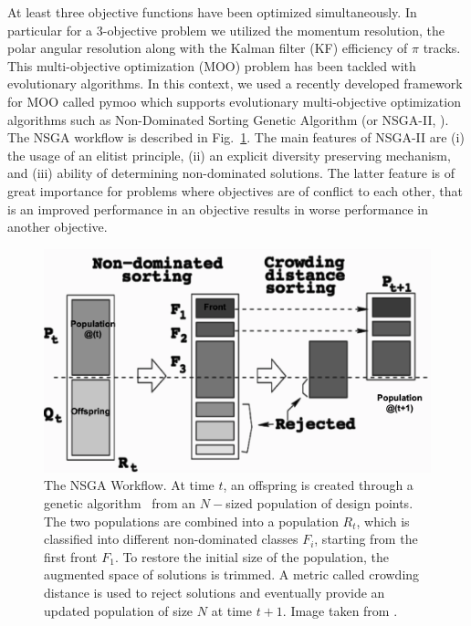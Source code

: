 At least three objective functions have been optimized simultaneously. In particular for a 3-objective problem we utilized the momentum resolution, the polar angular resolution along with the Kalman filter (KF) efficiency of $\pi$ tracks. 
This multi-objective optimization (MOO) problem has been tackled with evolutionary algorithms. 
In this context, we used a recently developed framework for MOO called pymoo \cite{blank2020pymoo} which supports evolutionary multi-objective optimization algorithms such as Non-Dominated Sorting Genetic Algorithm (or NSGA-II, \cite{deb2002fast}). 
The NSGA workflow is described in Fig.~\ref{fig:NSGA_workflow}.
The main features of NSGA-II are (i) the usage of an elitist principle, (ii) an explicit diversity preserving mechanism, and (iii) ability of determining non-dominated solutions. 
%
The latter feature is of great importance for problems where objectives are of conflict to each other, that is an improved performance in an objective results in worse performance in another objective.

\begin{figure}[!]
    \centering
    \includegraphics[scale = 0.35]{figs/NSGA_workflow2.png}
    \caption{The NSGA Workflow. At time $t$, an offspring is created through a genetic algorithm~\cite{whitley1994genetic} from an $N-$sized population of design points. 
    The two populations are combined into a population $R_{t}$, which is classified into different non-dominated classes $F_{i}$, starting from the first front $F_{1}$. 
    To restore the initial size of the population, the augmented space of solutions is trimmed. A metric called crowding distance is used to reject solutions and eventually provide an updated population of size $N$ at time $t+1$. 
    Image taken from \cite{deb2002fast}.
    }
    \label{fig:NSGA_workflow}
\end{figure}

